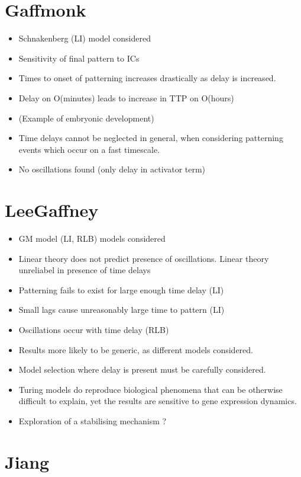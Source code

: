 \documentclass[12pt]{article}
\begin{document}
\section{Gaffmonk}

\begin{itemize}
\item Schnakenberg (LI) model considered
\item Sensitivity of final pattern to ICs
\item Times to onset of patterning increases drastically as delay is increased.
\item Delay on O(minutes) leads to increase in TTP on O(hours)
\item (Example of embryonic development)
\item Time delays cannot be neglected in general, when considering patterning events which occur on a fast timescale.
\item No oscillations found (only delay in activator term)
\end{itemize}

\section{LeeGaffney}

\begin{itemize}
\item GM model (LI, RLB) models considered
\item Linear theory does not predict presence of oscillations. Linear theory unreliabel in presence of time delays
\item Patterning fails to exist for large enough time delay (LI)
\item Small lags cause unreasonably large time to pattern (LI)
\item Oscillations occur with time delay (RLB)
\item Results more likely to be generic, as different models considered.
\item Model selection where delay is present must be carefully considered.
\item Turing models do reproduce biological phenomena that can be otherwise difficult to explain, yet the results are sensitive to gene expression dynamics.
\item Exploration of a stabilising mechanism ?
\end{itemize}

\section{Jiang}
\end{document}
